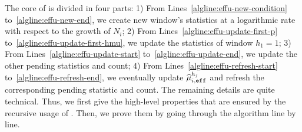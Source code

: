 The core of \EFF is divided in four parts: 1) From Lines~\ref{algline:effu-new-condition} to~\ref{algline:effu-new-end}, we create new window's statistics at a logarithmic rate with respect to the growth of $N_i$; 2) From Lines~\ref{algline:effu-update-first-p} to~\ref{algline:effu-update-first-hmu}, we update the statistics of window $h_1=1$;
3) From Lines~\ref{algline:effu-update-start} to~\ref{algline:effu-update-end}, we update the other pending statistics and count;
4) From Lines~\ref{algline:effu-refresh-start} to~\ref{algline:effu-refresh-end}, we eventually update $\widehat{\mu}_{i,\texttt{\footnotesize{eff}}}^{h_j}$ and refresh the corresponding pending statistic and count. The remaining details are quite technical. Thus, we first give the high-level properties that are ensured by the recursive usage of \EFF. Then, we prove them by going through the algorithm line by line.\newpage


